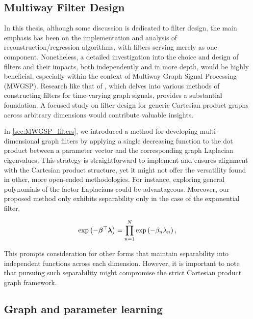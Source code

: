 \subsection{Multiway Filter Design}

In this thesis, although some discussion is dedicated to filter design, the main emphasis has been on the implementation and analysis of reconstruction/regression algorithms, with filters serving merely as one component. Nonetheless, a detailed investigation into the choice and design of filters and their impacts, both independently and in more depth, would be highly beneficial, especially within the context of Multiway Graph Signal Processing (MWGSP). Research like that of \cite{Jiang2021}, which delves into various methods of constructing filters for time-varying graph signals, provides a substantial foundation. A focused study on filter design for generic Cartesian product graphs across arbitrary dimensions would contribute valuable insights.

In \cref{sec:MWGSP_filters}, we introduced a method for developing multi-dimensional graph filters by applying a single decreasing function to the dot product between a parameter vector and the corresponding graph Laplacian eigenvalues. This strategy is straightforward to implement and ensures alignment with the Cartesian product structure, yet it might not offer the versatility found in other, more open-ended methodologies. For instance, exploring general polynomials of the factor Laplacians could be advantageous. Moreover, our proposed method only exhibits separability only in the case of the exponential filter. 

\begin{equation}
\exp \left( - \boldsymbol{\beta}^\top \boldsymbol{\lambda} \right) = \prod_{n=1}^N \exp\left(-\beta_n \lambda_n \right),
\end{equation}

\vspace{-0.3cm}

This prompts consideration for other forms that maintain separability into independent functions across each dimension. However, it is important to note that pursuing such separability might compromise the strict Cartesian product graph framework. 

\subsection{Graph and parameter learning}

